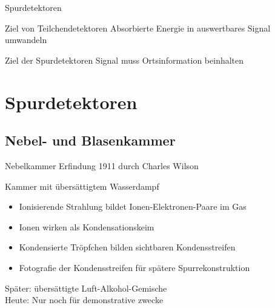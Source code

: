\documentclass{beamer}
\begin{document}
\begin{frame}{Spurdetektoren}
	\begin{block}{Ziel von Teilchendetektoren}
		Absorbierte Energie in auswertbares Signal umwandeln 
	\end{block}
	
	\begin{exampleblock}{Ziel der Spurdetektoren}
		Signal muss Ortsinformation beinhalten
	\end{exampleblock}
\end{frame}


\section{Spurdetektoren}


\subsection{Nebel- und Blasenkammer}


\begin{frame}{Nebelkammer}
	Erfindung 1911 durch Charles Wilson
	\begin{block}{Kammer mit übersättigtem Wasserdampf}
		\begin{itemize}
		  \item Ionisierende Strahlung bildet Ionen-Elektronen-Paare im Gas
		  \item Ionen wirken als Kondensationskeim
		  \item Kondensierte Tröpfchen bilden sichtbaren Kondensstreifen 
		  \item Fotografie der Kondensstreifen für spätere Spurrekonstruktion
		\end{itemize}
	\end{block}
	Später: übersättigte Luft-Alkohol-Gemische\\
	Heute: Nur noch für demonstrative zwecke
\end{frame}
\end{document}
